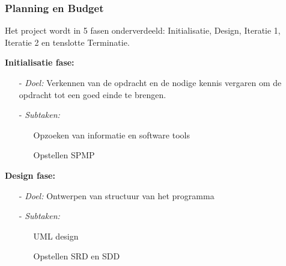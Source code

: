 \documentclass{article}
\begin{document}
\subsubsection{Planning en Budget}


Het project wordt in 5 fasen onderverdeeld: Initialisatie, Design, Iteratie 1, Iteratie 2 en tenslotte Terminatie.

\textbf{Initialisatie fase:}
\begin{itemize}
\item[-] \textit{Doel:} Verkennen van de opdracht en de nodige kennis vergaren om de opdracht tot een goed einde te brengen. \\[-5mm]
\item[-] \textit{Subtaken:}\\[-5mm]
\begin{itemize}
	\item[] Opzoeken van informatie en software tools\\[-5mm]
	\item[] Opstellen SPMP\\[-5mm]
\end{itemize}
\end{itemize}

\textbf{Design fase:}
\begin{itemize}
\item[-] \textit{Doel:} Ontwerpen van structuur van het programma \\[-5mm]
\item[-] \textit{Subtaken:}\\[-5mm]
\begin{itemize}
	\item[] UML design\\[-5mm]
	\item[]Opstellen SRD en SDD\\[-5mm]
\end{itemize}

\end{itemize}
\end{document}
